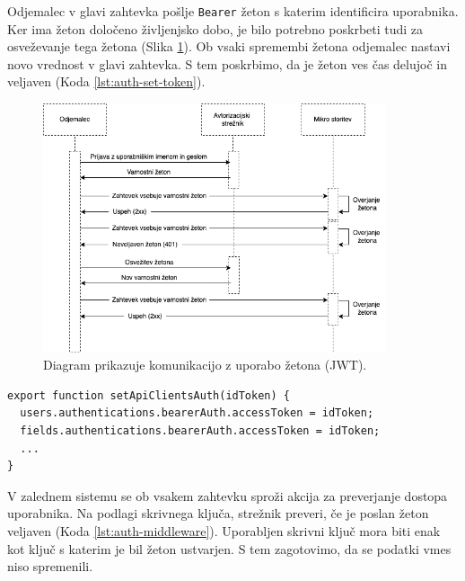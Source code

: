 \documentclass[a4paper, 12pt]{book}
\begin{document}
Odjemalec v glavi zahtevka pošlje \verb=Bearer= žeton s katerim identificira uporabnika. Ker ima žeton določeno življenjsko dobo, je bilo potrebno poskrbeti tudi za osveževanje tega žetona (Slika \ref{token-flow}). Ob vsaki spremembi žetona odjemalec nastavi novo vrednost v glavi zahtevka. S tem poskrbimo, da je žeton ves čas delujoč in veljaven (Koda \ref{lst:auth-set-token}).

\begin{figure}[h]
\begin{center}
\includegraphics[width=0.9\textwidth]{slike/token-flow.png}
\end{center}
\caption{ Diagram prikazuje komunikacijo z uporabo žetona (JWT). }
\label{token-flow}
\end{figure}

\begin{lstlisting}[style=mystyle,caption={Izsek kode za nastavljanje žetona posameznemu odjemalcu.},label=lst:auth-set-token]
export function setApiClientsAuth(idToken) {
  users.authentications.bearerAuth.accessToken = idToken;
  fields.authentications.bearerAuth.accessToken = idToken;
  ...
}
\end{lstlisting}

V zalednem sistemu se ob vsakem zahtevku sproži akcija za preverjanje dostopa uporabnika. Na podlagi skrivnega ključa, strežnik preveri, če je poslan žeton veljaven (Koda \ref{lst:auth-middleware}). Uporabljen skrivni ključ mora biti enak kot ključ s katerim je bil žeton ustvarjen. S tem zagotovimo, da se podatki vmes niso spremenili. 
\end{document}
